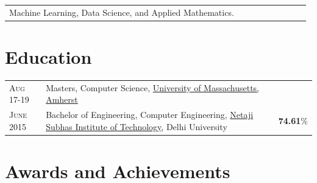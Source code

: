 \documentclass[a4paper]{article} %
\newcommand{\verticalspacing}{-0.25cm}
\newcommand{\projectheadspacing}{6.9cm}
\newcommand{\lineskill}[2]{%
    \begin{tabular}{p{0.98\linewidth}r}
        \small {#2} & \multicolumn{1}{m{ \projectheadspacing{} }}{\raggedleft \textsc{\small #1}}\\
    \end{tabular}
    \vspace{\verticalspacing{}}
    \vspace{-0.0cm} %
}
\begin{document}
\lineskill
    {}
    {Machine Learning, Data Science, and Applied Mathematics.}
	

\section{Education}
\def\arraystretch{1.2}
\begin{tabular}{>{\raggedleft}p{1.5cm}p{14.6cm}r}

    \textsc{Aug 17-19} & Masters, Computer Science,
    \href{https://www.cics.umass.edu/}{University of Massachusetts, Amherst}\\

    \textsc{June 2015} & Bachelor of Engineering, Computer Engineering,
    \href{http://nsit.ac.in/}{Netaji Subhas Institute of Technology}, Delhi University
    & \textbf{74.61}\%\\



\end{tabular}
\def\arraystretch{1}



\section{Awards and Achievements}
\end{document}
